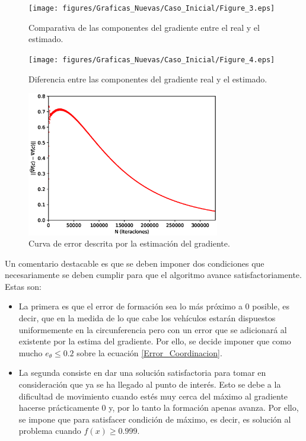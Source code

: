 \begin{figure}[H]
\centering
\texttt{[image: figures/Graficas\_Nuevas/Caso\_Inicial/Figure\_3.eps]}
\caption{Comparativa de las componentes del gradiente entre el real y el estimado.} \label{grad}
\end{figure}

\begin{figure}[H]
\centering
\texttt{[image: figures/Graficas\_Nuevas/Caso\_Inicial/Figure\_4.eps]}
\caption{Diferencia entre las componentes del gradiente real y el estimado.} \label{Dif_grad}
\end{figure}

\begin{figure}[H]
\centering
\includegraphics[width=0.75\textwidth]{figures/Graficas_Nuevas/Caso_Inicial/Figure_5.eps}
\caption{Curva de error descrita por la estimación del gradiente.} \label{Curva_error}
\end{figure}

Un comentario destacable es que se deben imponer dos condiciones que necesariamente se deben cumplir para que el algoritmo avance satisfactoriamente. Estas son:

\begin{itemize}
	\item La primera es que el error de formación sea lo más próximo a 0 posible, es decir, que en la medida de lo que cabe los vehículos estarán dispuestos uniformemente en la circunferencia pero con un error que se adicionará al existente por la estima del gradiente. Por ello, se decide imponer que como mucho $e_{\theta}\leq{0.2}$ sobre la ecuación \ref{Error_Coordinacion}.
	\item La segunda consiste en dar una solución satisfactoria para tomar en consideración que ya se ha llegado al punto de interés. Esto se debe a la dificultad de movimiento cuando estés muy cerca del máximo al gradiente hacerse prácticamente 0 y, por lo tanto la formación apenas avanza. Por ello, se impone que para satisfacer condición de máximo, es decir, es solución al problema cuando $f(x)\geq{0.999}$.
\end{itemize}

